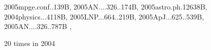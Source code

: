 \documentclass[12pt]{article}
\begin{document}
\begin{description}
{2005mpge.conf..139B,%
2005AN....326..174B,%
2005astro.ph.12638B,%
2004physics...4118B,%
2005LNP...664..219B,%
2005ApJ...625..539B,%
2005AN....326..787B%
},\item
20 times in 2004 \citep{
2004ASPC..325..165N,%
2004A&A...427...13B,%
2004IJAsB...3..209B,%
2004IAUS..219..656D,%
2004A&A...423.1101D,%
2004PhRvE..70b6405H,%
2004PhRvE..70c6408H,%
2004PhRvE..70a6308H,%
2004Ap&SS.292...53H,%
2004MNRAS.353..947H,%
2004PhRvE..69e6303Y,%
2004A&A...417..361J,%
2004DDA....35.0407M,%
2004PhRvE..70e6301P,%
2004PhRvE..69e6407B,%
2004IAUS..223..239D,%
2004AIPC..733..122B,%
2004PhFl...16.1020B,%
}
\end{description}
\end{document}
